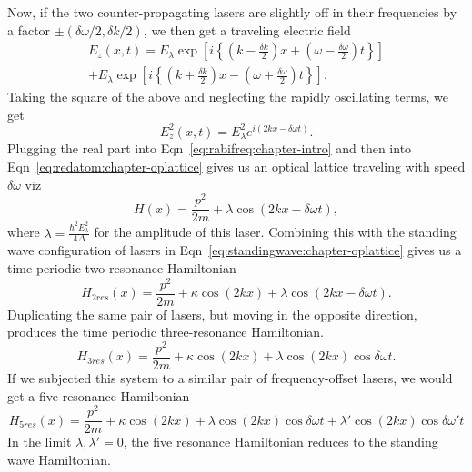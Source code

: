 Now, if the two counter-propagating lasers are slightly off in their frequencies by a factor $\pm  ({\delta \omega}/2,{\delta k}/2)$, we then get a traveling electric field
\begin{multline}
E_z(x,t) =  E_\lambda  \exp{ \left[ i \left\{ \left( k-\frac{\delta k}{2} \right)x +  \left(\omega-\frac{\delta \omega}{2} \right)t \right\} \right] } \\
  +  E_\lambda \exp{\left[ i \left\{ \left( k+\frac{\delta k}{2} \right)x -  \left(\omega+\frac{\delta \omega}{2} \right)t \right\} \right]}.
\end{multline}
Taking the square of the above and neglecting the rapidly oscillating terms, we get 
\begin{equation}
E^2_z(x,t) = E^2_\lambda e^{i\left(2kx - \delta \omega t \right)}.
\end{equation}
Plugging the real part into Eqn~\ref{eq:rabifreq:chapter-intro} and then into Eqn~\ref{eq:redatom:chapter-oplattice} gives us an optical lattice traveling with speed $\delta \omega$ viz
\begin{equation}
H(x)=\frac{p^2}{2m} + \lambda \cos{\left( 2kx-\delta \omega t \right)},
\end{equation}
where $\lambda=\frac{\hbar^2 E^2_\lambda}{4\Delta}$ for the amplitude of this laser. Combining this with the standing wave configuration of lasers in Eqn~\ref{eq:standingwave:chapter-oplattice} gives us a time periodic two-resonance Hamiltonian
\begin{equation}
H_{2res}(x)=\frac{p^2}{2m} +\kappa \cos{\left( 2 kx \right)}+ \lambda \cos{\left(2kx-\delta \omega t\right)}.
\label{eq:twores:chapter-oplattice}
\end{equation}
Duplicating the same pair of lasers, but moving in the opposite direction, produces the time periodic three-resonance Hamiltonian. 
\begin{equation}
H_{3res}(x)=\frac{p^2}{2m} +\kappa \cos{\left( 2 kx \right)}+ \lambda \cos{\left( 2kx \right)}\cos{\delta \omega t}.
\label{eq:threeres:chapter-oplattice}
\end{equation}
If we subjected this system to a similar pair of frequency-offset lasers, we would get a five-resonance Hamiltonian
\begin{equation}
H_{5res}(x)=\frac{p^2}{2m} +\kappa \cos{\left( 2 kx\right) }+ \lambda \cos{\left( 2kx \right)} \cos{\delta \omega t}+\lambda' \cos{\left( 2kx \right)} \cos{\delta \omega ' t}
\label{eq:fiveres:chapter-oplattice}
\end{equation}
In the limit $\lambda, \lambda'=0$, the five resonance Hamiltonian reduces to the standing wave Hamiltonian. 

